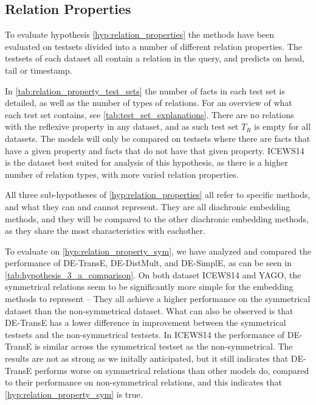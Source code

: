 \subsection{Relation Properties}
\label{sec:relation_properties_experiment}



%
%
%




To evaluate hypothesis \autoref{hyp:relation_properties} the methods have been evaluated on testsets divided into a number of different relation properties. The testsets of each dataset all contain a relation in the query, and predicts on head, tail or timestamp.

In \autoref{tab:relation_property_test_sets} the number of facts in each test set is detailed, as well as the number of types of relations.
For an overview of what each test set contains, see \autoref{tab:test_set_explanations}. There are no relations with the reflexive property in any dataset, and as such test set $T_R$ is empty for all datasets.
The models will only be compared on testsets where there are facts that have a given property and facts that do not have that given property. ICEWS14 is the dataset best suited for analysis of this hypothesis, as there is a higher number of relation types, with more varied relation properties.

All three sub-hypotheses of \autoref{hyp:relation_properties} all refer to specific methods, and what they can and cannot represent. They are all diachronic embedding methods, and they will be compared to the other diachronic embedding methods, as they share the most characteristics with eachother.

To evaluate on \autoref{hyp:relation_property_sym}, we have analyzed and compared the performance of DE-TransE, DE-DistMult, and DE-SimplE, as can be seen in \autoref{tab:hypothesis_3_a_comparison}.
On both dataset ICEWS14 and YAGO, the symmetrical relations seem to be significantly more simple for the embedding methods to represent -- They all achieve a higher performance on the symmetrical dataset than the non-symmetrical dataset. What can also be observed is that DE-TransE has a lower difference in improvement between the symmetrical testsets and the non-symmetrical testsets. In ICEWS14 the performance of DE-TransE is similar across the symmetrical testset as the non-symmetrical. The results are not as strong as we initally anticipated, but it still indicates that DE-TransE performs worse on symmetrical relations than other models do, compared to their performance on non-symmetrical relations, and this indicates that \autoref{hyp:relation_property_sym} is true.

